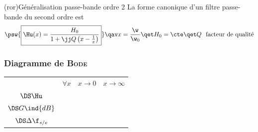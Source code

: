 \documentclass[../../main/main.tex]{subfiles}
\begin{document}
\begin{tcb}(ror){Généralisation passe-bande ordre 2}
	La forme canonique d'un filtre passe-bande du second ordre est
	\[
		\psw{%
			\boxed{\Hu(x) = \frac{H_0}{1 + \jj Q \left( x - \frac{1}{x} \right)}}
		}%
		\qav
		x = \frac{\w}{\w_0}
		\qet
		H_0 = \cte
		\qet
		Q \text{~ facteur de qualité}
	\]
	\vspace{-15pt}
\end{tcb}
\subsubsection{Diagramme de \textsc{Bode}}
\begin{center}
	\begin{tabularx}{\linewidth}{cYYY}
		\toprule
		 &
		$\forall x$
		 &
		$x\to 0$
		 &
		$x\to\infty$
		\\
		\addlinespace[0.5em]
		\cmidrule(lr){2-4}
		$\DS\Hu$
		 &
		 &
		 &
		\\
		\addlinespace[0.5em]
		$\DS G\ind{dB}$
		 &
		 &
		 &
		\\
		\addlinespace[0.5em]
		$\DS\Delta\f_{s/e}$
		 &
		 &
		 &
		\\
		\bottomrule
	\end{tabularx}
	\label{tab:rlcr}
\end{center}
\end{document}
